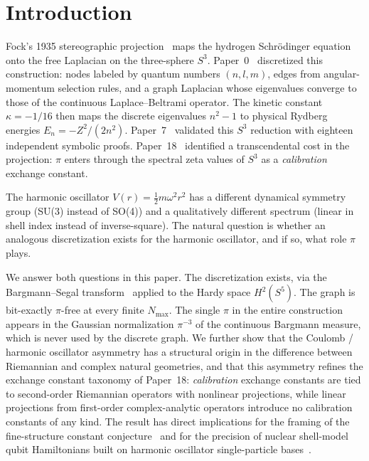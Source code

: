 \documentclass[twocolumn,pra,amsmath,amssymb,superscriptaddress]{revtex4-2}
\begin{document}
\section{Introduction}

Fock's 1935 stereographic projection~\cite{fock1935} maps the
hydrogen Schr\"odinger equation onto the free Laplacian on the
three-sphere $S^3$.  Paper~0~\cite{paper0} discretized this
construction: nodes labeled by quantum numbers $(n, l, m)$, edges
from angular-momentum selection rules, and a graph Laplacian whose
eigenvalues converge to those of the continuous Laplace--Beltrami
operator.  The kinetic constant $\kappa = -1/16$ then maps the
discrete eigenvalues $n^2 - 1$ to physical Rydberg energies
$E_n = -Z^2 / (2 n^2)$.  Paper~7~\cite{paper7} validated this
$S^3$ reduction with eighteen independent symbolic proofs.
Paper~18~\cite{paper18} identified a transcendental cost in the
projection: $\pi$ enters through the spectral zeta values of $S^3$
as a \emph{calibration} exchange constant.

The harmonic oscillator $V(r) = \frac{1}{2} m \omega^2 r^2$ has a
different dynamical symmetry group (SU(3) instead of SO(4)) and a
qualitatively different spectrum (linear in shell index instead of
inverse-square).  The natural question is whether an analogous
discretization exists for the harmonic oscillator, and if so, what
role $\pi$ plays.

We answer both questions in this paper.  The discretization exists,
via the Bargmann--Segal transform~\cite{bargmann1961, hall1994}
applied to the Hardy space $H^2(S^5)$.  The graph is bit-exactly
$\pi$-free at every finite $N_{\max}$.  The single $\pi$ in the
entire construction appears in the Gaussian normalization $\pi^{-3}$
of the continuous Bargmann measure, which is never used by the
discrete graph.  We further show that the Coulomb / harmonic
oscillator asymmetry has a structural origin in the difference
between Riemannian and complex natural geometries, and that this
asymmetry refines the exchange constant taxonomy of Paper~18:
\emph{calibration} exchange constants are tied to second-order
Riemannian operators with nonlinear projections, while linear
projections from first-order complex-analytic operators introduce no
calibration constants of any kind.  The result has direct
implications for the framing of the fine-structure constant
conjecture~\cite{paper2_alpha} and for the precision of nuclear
shell-model qubit Hamiltonians built on harmonic oscillator
single-particle bases~\cite{paper23}.
\end{document}
